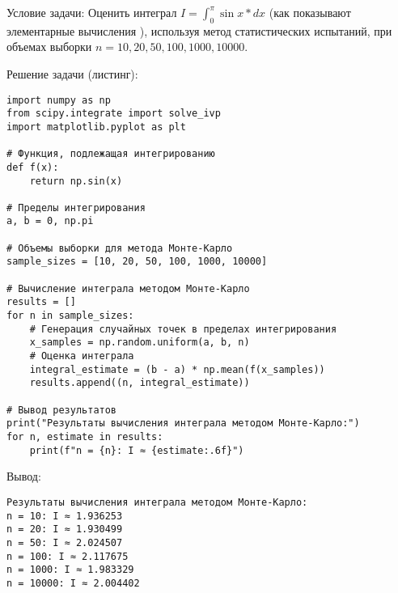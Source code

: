 Условие задачи: Оценить интеграл $I = \int^{\pi}_{0}\sin{x*dx}$ (как показывают элементарные вычисления ), используя метод статистических испытаний, при объемах выборки $n = 10, 20, 50, 100, 1000, 10000$.

Решение задачи (листинг):

\begin{verbatim}
import numpy as np
from scipy.integrate import solve_ivp
import matplotlib.pyplot as plt

# Функция, подлежащая интегрированию
def f(x):
    return np.sin(x)

# Пределы интегрирования
a, b = 0, np.pi

# Объемы выборки для метода Монте-Карло
sample_sizes = [10, 20, 50, 100, 1000, 10000]

# Вычисление интеграла методом Монте-Карло
results = []
for n in sample_sizes:
    # Генерация случайных точек в пределах интегрирования
    x_samples = np.random.uniform(a, b, n)
    # Оценка интеграла
    integral_estimate = (b - a) * np.mean(f(x_samples))
    results.append((n, integral_estimate))

# Вывод результатов
print("Результаты вычисления интеграла методом Монте-Карло:")
for n, estimate in results:
    print(f"n = {n}: I ≈ {estimate:.6f}")
\end{verbatim}

Вывод:
\begin{verbatim}
Результаты вычисления интеграла методом Монте-Карло:
n = 10: I ≈ 1.936253
n = 20: I ≈ 1.930499
n = 50: I ≈ 2.024507
n = 100: I ≈ 2.117675
n = 1000: I ≈ 1.983329
n = 10000: I ≈ 2.004402
\end{verbatim}